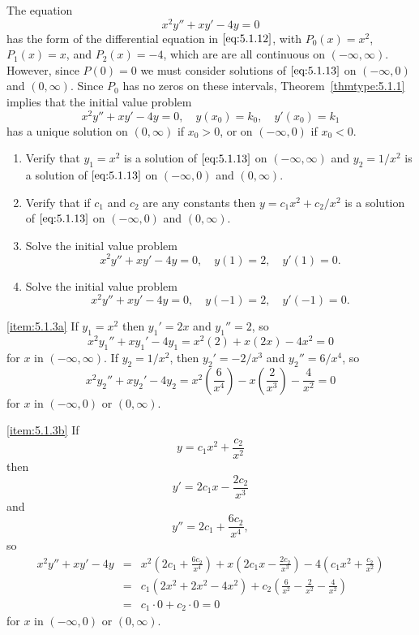 \documentclass{ximera}
\begin{document}
\begin{example}\label{example:5.1.3} 
The equation
\begin{equation}\label{eq:5.1.13}
x^2y''+xy'-4y=0
\end{equation}
has the form of the differential equation in $\eqref{eq:5.1.12}$, with
$P_0(x)=x^2$, $P_1(x)=x$, and $P_2(x)=-4$, which are are all
continuous on $(-\infty,\infty)$. However, since $P(0)=0$ we must
consider solutions of $\eqref{eq:5.1.13}$ on $(-\infty,0)$ and $(0,\infty)$.
Since $P_0$ has no zeros on these intervals, Theorem~\ref{thmtype:5.1.1}
implies that the initial value problem
$$
x^2y''+xy'-4y=0,\quad y(x_0)=k_0,\quad y'(x_0)=k_1
$$
has a unique solution on $(0,\infty)$ if $x_0>0$, or on $(-\infty,0)$
if $x_0<0$.
 
\begin{enumerate}
\item\label{item:5.1.3a}%
Verify that $y_1=x^2$ is a solution of $\eqref{eq:5.1.13}$ on
$(-\infty,\infty)$ and $y_2=1/x^2$ is a solution of $\eqref{eq:5.1.13}$
on $(-\infty,0)$  and $(0,\infty)$.
\item\label{item:5.1.3b}%
Verify that if $c_1$ and $c_2$ are any constants then
$y=c_1x^2+c_2/x^2$ is a solution of $\eqref{eq:5.1.13}$ on $(-\infty,0)$
and $(0,\infty)$.
\item\label{item:5.1.3c}%
Solve the initial value problem
\begin{equation}\label{eq:5.1.14}
x^2y''+xy'-4y=0,\quad y(1)=2,\quad y'(1)=0.
\end{equation}
\item\label{item:5.1.3d}%
Solve the initial value problem
\begin{equation}\label{eq:5.1.15}
x^2y''+xy'-4y=0,\quad y(-1)=2,\quad y'(-1)=0.
\end{equation}
\end{enumerate}
\begin{explanation}
\ref{item:5.1.3a} If $y_1=x^2$ then $y_1'=2x$ and $y_1''=2$, so
$$
x^2y_1''+xy_1'-4y_1=x^2(2)+x(2x)-4x^2=0
$$
for $x$ in $(-\infty,\infty)$.
If $y_2=1/x^2$, then $y_2'=-2/x^3$ and $y_2''=6/x^4$, so
$$
x^2y_2''+xy_2'-4y_2=x^2\left(\frac{6}{x^4}\right)-x\left(\frac{2}{x^3}\right)-{\frac{4}{x^2}}=0
$$
for $x$ in $(-\infty,0)$ or $(0,\infty)$.
 
\ref{item:5.1.3b} If
\begin{equation}\label{eq:5.1.16}
y=c_1x^2+\frac{c_2}{x^2}
\end{equation}
 then
\begin{equation}\label{eq:5.1.17}
y'=2c_1x-\frac{2c_2}{x^3}
\end{equation}
and
$$
y''=2c_1+\frac{6c_2}{x^4},
$$
so
\begin{eqnarray*}
x^2y''+xy'-4y&=&x^2\left(2c_1+\frac{6c_2}{x^4}\right)
+x\left(2c_1x-\frac{2c_2}{x^3}\right)
-4\left(c_1x^2+\frac{c_2}{x^2}\right)\\
&=&c_1(2x^2+2x^2-4x^2)
+c_2\left(\frac{6}{x^2}-\frac{2}{x^2}-\frac{4}{x^2}\right)
\\
&=&c_1\cdot0+c_2\cdot0=0
\end{eqnarray*}
for $x$ in $(-\infty,0)$ or $(0,\infty)$.
 

\end{explanation}
\end{example}
\end{document}
